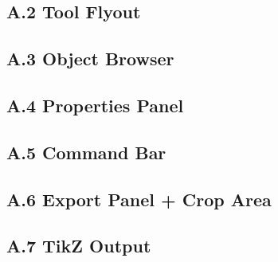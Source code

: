 \documentclass[11pt,a4paper]{article}
\begin{document}
\subsection*{A.2 Tool Flyout}

\subsection*{A.3 Object Browser}

\subsection*{A.4 Properties Panel}

\subsection*{A.5 Command Bar}

\subsection*{A.6 Export Panel + Crop Area}

\subsection*{A.7 TikZ Output}
\end{document}
